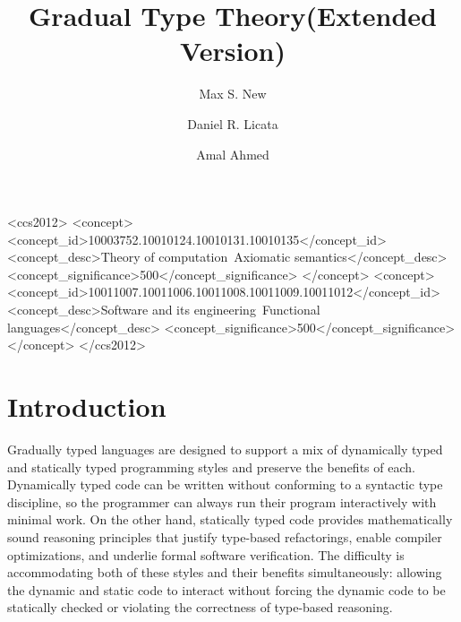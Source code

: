 \documentclass[acmsmall,nonacm]{acmart}
\title{Gradual Type Theory\iflong (Extended Version)\fi}
\author{Max S. New}
\affiliation{
  \institution{Northeastern University}            %
}
\author{Daniel R. Licata}
\affiliation{
  \institution{Wesleyan University}            %
}
\author{Amal Ahmed}
\affiliation{
  \institution{Northeastern University and Inria Paris}            %
}
\begin{document}
\begin{abstract}

\end{abstract}

 \begin{CCSXML}
<ccs2012>
<concept>
<concept_id>10003752.10010124.10010131.10010135</concept_id>
<concept_desc>Theory of computation~Axiomatic semantics</concept_desc>
<concept_significance>500</concept_significance>
</concept>
<concept>
<concept_id>10011007.10011006.10011008.10011009.10011012</concept_id>
<concept_desc>Software and its engineering~Functional languages</concept_desc>
<concept_significance>500</concept_significance>
</concept>
</ccs2012>
\end{CCSXML}





\maketitle

\section{Introduction}

Gradually typed languages are designed to support a mix of dynamically
typed and statically typed programming styles and preserve the
benefits of each.
%
Dynamically typed code can be written without conforming to a
syntactic type discipline, so the programmer can always run their
program interactively with minimal work.
%
On the other hand, statically typed code provides mathematically
sound reasoning principles that justify type-based refactorings,
enable compiler optimizations, and underlie formal software verification.
%
The difficulty is accommodating both of these styles and their benefits simultaneously:
allowing the dynamic and static code to interact without forcing the
dynamic code to be statically checked or violating the correctness of
type-based reasoning.
\end{document}
